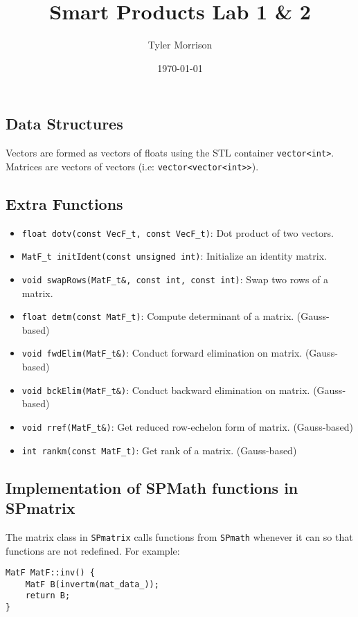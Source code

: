 \documentclass{article}
\title{Smart Products Lab 1 \& 2}
\author{Tyler Morrison}
\date\today
\begin{document}
\maketitle
\section{}
\subsection{Data Structures}
Vectors are formed as vectors of floats using the STL container \texttt{vector<int>}. Matrices are vectors of vectors (i.e: \texttt{vector<vector<int>>}).

\subsection{Extra Functions}

\begin{itemize}
	\item \texttt{float dotv(const VecF_t, const VecF_t)}: Dot product of two vectors.
	\item \texttt{MatF_t initIdent(const unsigned int)}: Initialize an identity matrix.
	\item \texttt{void swapRows(MatF_t\&, const int, const int)}: Swap two rows of a matrix.
	\item \texttt{float detm(const MatF_t)}: Compute determinant of a matrix. (Gauss-based)
	\item \texttt{void fwdElim(MatF_t\&)}: Conduct forward elimination on matrix. (Gauss-based)
	\item \texttt{void bckElim(MatF_t\&)}: Conduct backward elimination on matrix. (Gauss-based)
	\item \texttt{void rref(MatF_t\&)}: Get reduced row-echelon form of matrix. (Gauss-based)
	\item \texttt{int rankm(const MatF_t)}: Get rank of a matrix. (Gauss-based)
\end{itemize}

\subsection{Implementation of SPMath functions in SPmatrix}
The matrix class in \texttt{SPmatrix} calls functions from \texttt{SPmath} whenever it can so that functions are not redefined. For example:

\begin{lstlisting}
MatF MatF::inv() {
	MatF B(invertm(mat_data_));
	return B;
}
\end{lstlisting}
\end{document}
